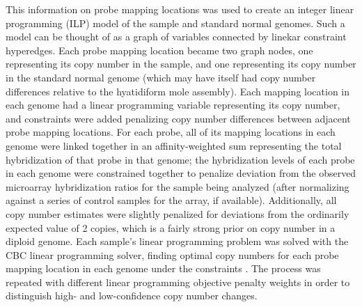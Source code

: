 \documentclass[11pt,proposal]{ucthesis}
\begin{document}
This information on probe mapping locations was used to create an integer linear programming (ILP) model of the sample and standard normal genomes. Such a model can be thought of as a graph of variables connected by linekar constraint hyperedges. Each probe mapping location became two graph nodes, one representing its copy number in the sample, and one representing its copy number in the standard normal genome (which may have itself had copy number differences relative to the hyatidiform mole assembly). Each mapping location in each genome had a linear programming variable representing its copy number, and constraints were added penalizing copy number differences between adjacent probe mapping locations. For each probe, all of its mapping locations in each genome were linked together in an affinity-weighted sum representing the total hybridization of that probe in that genome; the hybridization levels of each probe in each genome were constrained together to penalize deviation from the observed microarray hybridization ratios for the sample being analyzed (after normalizing against a series of control samples for the array, if available). Additionally, all copy number estimates were slightly penalized for deviations from the ordinarily expected value of 2 copies, which is a fairly strong prior on copy number in a diploid genome. Each sample's linear programming problem was solved with the CBC linear programming solver, finding optimal copy numbers for each probe mapping location in each genome under the constraints \cite{forrest2013cbc}. The process was repeated with different linear programming objective penalty weights in order to distinguish high- and low-confidence copy number changes.
\end{document}
